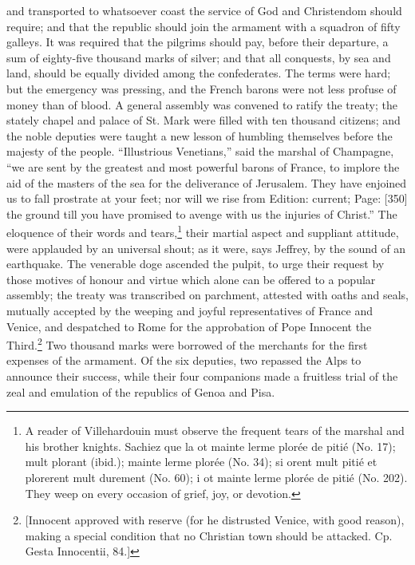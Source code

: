 and transported to whatsoever coast the service of God and Christendom should require; and that the republic should join the armament with a squadron of fifty galleys. It was required that the pilgrims should pay, before their departure, a sum of eighty-five thousand marks of silver; and that all conquests, by sea and land, should be equally divided among the confederates. The terms were hard; but the emergency was pressing, and the French barons were not less profuse of money than of blood. A general assembly was convened to ratify the treaty; the stately chapel and palace of St. Mark were filled with ten thousand citizens; and the noble deputies were taught a new lesson of humbling themselves before the majesty of the people. \texthebrew{“}Illustrious Venetians,\texthebrew{}” said the marshal of Champagne, \texthebrew{“}we are sent by the greatest and most powerful barons of France, to implore the aid of the masters of the sea for the deliverance of Jerusalem. They have enjoined us to fall prostrate at your feet; nor will we rise from Edition: current; Page: [350] the ground till you have promised to avenge with us the injuries of Christ.\texthebrew{}” The eloquence of their words and tears,\footnote{A reader of Villehardouin must observe the frequent tears of the marshal and his brother knights. Sachiez que la ot mainte lerme plorée de pitié (No. 17); mult plorant (ibid.); mainte lerme plorée (No. 34); si orent mult pitié et plorerent mult durement (No. 60); i ot mainte lerme plorée de pitié (No. 202). They weep on every occasion of grief, joy, or devotion.} their martial aspect and suppliant attitude, were applauded by an universal shout; as it were, says Jeffrey, by the sound of an earthquake. The venerable doge ascended the pulpit, to urge their request by those motives of honour and virtue which alone can be offered to a popular assembly; the treaty was transcribed on parchment, attested with oaths and seals, mutually accepted by the weeping and joyful representatives of France and Venice, and despatched to Rome for the approbation of Pope Innocent the Third.\footnote{[Innocent approved with reserve (for he distrusted Venice, with good reason), making a special condition that no Christian town should be attacked. Cp. Gesta Innocentii, 84.]} Two thousand marks were borrowed of the merchants for the first expenses of the armament. Of the six deputies, two repassed the Alps to announce their success, while their four companions made a fruitless trial of the zeal and emulation of the republics of Genoa and Pisa.

